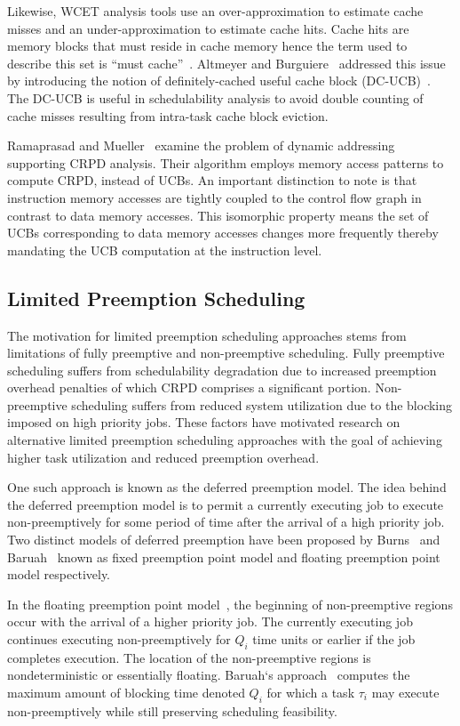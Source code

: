Likewise, WCET analysis tools use an over-approximation to estimate cache misses and an under-approximation to estimate cache hits.  Cache hits are memory blocks that must reside in cache memory hence the term used to describe this set is “must cache”~\cite{altmeyer:11c}.  Altmeyer and Burguiere~\cite{altmeyer:11c} addressed this issue by introducing the notion of definitely-cached useful cache block (DC-UCB)~\cite{altmeyer:11c}.  The DC-UCB is useful in schedulability analysis to avoid double counting of cache misses resulting from intra-task cache block eviction.

Ramaprasad and Mueller~\cite{ramaprasad:06} examine the problem of dynamic addressing supporting CRPD analysis. Their algorithm employs memory access patterns to compute CRPD, instead of UCBs.  An important distinction to note is that instruction memory accesses are tightly coupled to the control flow graph in contrast to data memory accesses. This isomorphic property means the set of UCBs corresponding to data memory accesses changes more frequently thereby mandating the UCB computation at the instruction level.
\subsection {Limited Preemption Scheduling}\label{sec:lp_related_work}
The motivation for limited preemption scheduling approaches stems from limitations of fully preemptive and non-preemptive scheduling.  Fully preemptive scheduling suffers from schedulability degradation due to increased preemption overhead penalties of which CRPD comprises a significant portion.  Non-preemptive scheduling suffers from reduced system utilization due to the blocking imposed on high priority jobs.  These factors have motivated research on alternative limited preemption scheduling approaches with the goal of achieving higher task utilization and reduced preemption overhead.

One such approach is known as the deferred preemption model.  The idea behind the deferred preemption model is to permit a currently executing job to execute non-preemptively for some period of time after the arrival of a high priority job.  Two distinct models of deferred preemption have been proposed by Burns~\cite{burns:05} and Baruah~\cite{baruah:05} known as fixed preemption point model and floating preemption point model respectively.

In the floating preemption point model~\cite{baruah:05}, the beginning of non-preemptive regions occur with the arrival of a higher priority job.  The currently executing job continues executing non-preemptively for \begin{math}Q_{i}\end{math} time units or earlier if the job completes execution. The location of the non-preemptive regions is nondeterministic or essentially floating. Baruah`s approach~\cite{baruah:05} computes the maximum amount of blocking time denoted \begin{math}Q_{i}\end{math} for which a task \begin{math}\tau_{i}\end{math} may execute non-preemptively while still preserving scheduling feasibility.

